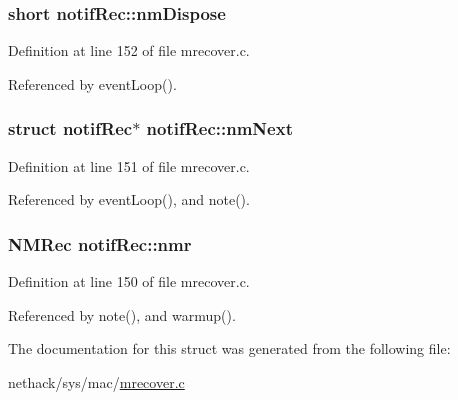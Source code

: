 \hypertarget{structnotifRec_a002162baa8a9b5cc6e32f457e410d330}{
\subsubsection[{nm\+Dispose}]{\setlength{\rightskip}{0pt plus 5cm}short notif\+Rec\+::nm\+Dispose}}\label{structnotifRec_a002162baa8a9b5cc6e32f457e410d330}


Definition at line 152 of file mrecover.\+c.



Referenced by event\+Loop().

\hypertarget{structnotifRec_ab1cfb88fe48e04f9af34302fed55d087}{
\subsubsection[{nm\+Next}]{\setlength{\rightskip}{0pt plus 5cm}struct {\bf notif\+Rec}$\ast$ notif\+Rec\+::nm\+Next}}\label{structnotifRec_ab1cfb88fe48e04f9af34302fed55d087}


Definition at line 151 of file mrecover.\+c.



Referenced by event\+Loop(), and note().

\hypertarget{structnotifRec_aa1b6afb9d9cc1501336c1e65c5c7f1d4}{
\subsubsection[{nmr}]{\setlength{\rightskip}{0pt plus 5cm}N\+M\+Rec notif\+Rec\+::nmr}}\label{structnotifRec_aa1b6afb9d9cc1501336c1e65c5c7f1d4}


Definition at line 150 of file mrecover.\+c.



Referenced by note(), and warmup().



The documentation for this struct was generated from the following file\+:\begin{DoxyCompactItemize}
\item 
nethack/sys/mac/\hyperlink{mrecover_8c}{mrecover.\+c}\end{DoxyCompactItemize}
